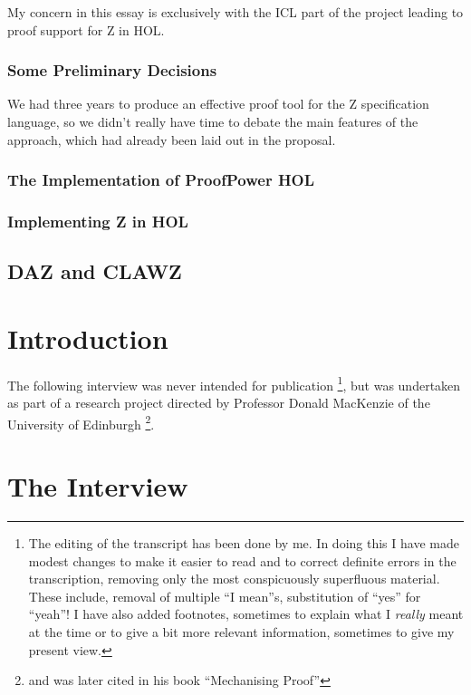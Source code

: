 \documentclass[10pt,titlepage]{book}
\begin{document}
My concern in this essay is exclusively with the ICL part of the project leading to proof support for Z in HOL.

\subsection{Some Preliminary Decisions}
We had three years to produce an effective proof tool for the Z specification language, so we didn't really have time to debate the main features of the approach, which had already been laid out in the proposal.

\subsection{The Implementation of ProofPower HOL}

\subsection{Implementing Z in HOL}

\section{DAZ and CLAWZ}

\appendix

\chapter{Introduction}
The following interview was never intended for publication%
\footnote{
The editing of the transcript has been done by me.
In doing this I have made modest changes to make it easier to read and to correct definite errors in the transcription, removing only the most conspicuously superfluous material.
These include, removal of multiple ``I mean''s, substitution of ``yes'' for ``yeah''!
I have also added footnotes, sometimes to explain what I {\it really} meant at the time or to give a bit more relevant information, sometimes to give my present view.

}, but was undertaken as part of a research project directed by Professor Donald MacKenzie of the University of Edinburgh%
\footnote{
and was later cited in his book ``Mechanising Proof''\cite{mackenzie}}.

\chapter{The Interview}
\end{document}
